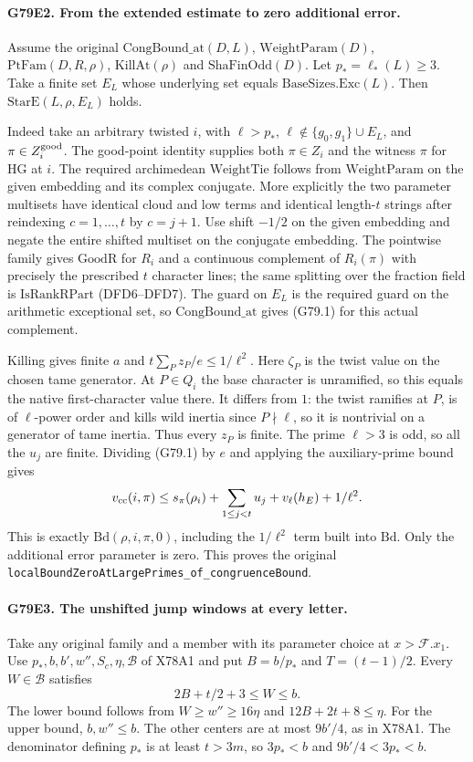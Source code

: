 \paragraph{G79E2. From the extended estimate to zero additional error.}
Assume the original $\mathrm{CongBound\_at}(D,L)$,
$\mathrm{WeightParam}(D)$, $\mathrm{PtFam}(D,R,\rho)$,
$\mathrm{KillAt}(\rho)$ and $\mathrm{ShaFinOdd}(D)$.
Let $p_*=\ell_*(L)\ge3$. Take a finite set $E_L$ whose underlying
set equals $\mathrm{BaseSizes.Exc}(L)$. Then
$\mathrm{StarE}(L,\rho,E_L)$ holds.

Indeed take an arbitrary twisted $i$, with $\ell>p_*$,
$\ell\notin\{g_0,g_1\}\cup E_L$, and $\pi\in Z_i^{\rm good}$.
The good-point identity supplies both $\pi\in Z_i$ and the witness
$\pi$ for $\mathrm{HG}$ at $i$. The required archimedean
$\mathrm{WeightTie}$ follows from $\mathrm{WeightParam}$ on the
given embedding and its complex conjugate. More explicitly the two
parameter multisets have identical cloud and low terms and identical
length-$t$ strings after reindexing $c=1,\ldots,t$ by $c=j+1$.
Use shift $-1/2$ on the given embedding and negate the entire shifted
multiset on the conjugate embedding. The pointwise family gives
$\mathrm{GoodR}$ for $R_i$ and a continuous complement of $R_i(\pi)$
with precisely the prescribed $t$ character lines; the same splitting
over the fraction field is $\mathrm{IsRankRPart}$ (DFD6--DFD7).
The guard on $E_L$ is the required guard on the arithmetic exceptional
set, so $\mathrm{CongBound\_at}$ gives (G79.1) for this actual complement.

Killing gives finite $a$ and
$t\sum_P z_P/e\le1/\ell^2$. Here $\zeta_P$ is the twist value
on the chosen tame generator. At $P\in Q_i$ the base character is
unramified, so this equals the native first-character value there.
It differs from $1$: the twist ramifies at $P$, is of $\ell$-power
order and kills wild inertia since $P\nmid\ell$, so it is nontrivial
on a generator of tame inertia. Thus every $z_P$ is finite.
The prime $\ell>3$ is odd, so all the $u_j$ are finite. Dividing
(G79.1) by $e$ and applying the auxiliary-prime bound gives
\[
 v_{\rm cc}(i,\pi)\le s_\pi(\rho_i)+
 \sum_{1\le j<t}u_j+v_\ell(h_E)+1/\ell^2.
\]
This is exactly $\mathrm{Bd}(\rho,i,\pi,0)$, including the
$1/\ell^2$ term built into $\mathrm{Bd}$. Only the additional
error parameter is zero. This proves the original
\texttt{localBoundZeroAtLargePrimes\_\allowbreak of\_\allowbreak congruenceBound}.

\paragraph{G79E3. The unshifted jump windows at every letter.}
Take any original family and a member with its parameter choice at
$x>\mathcal F.x_1$. Use $p_*,b,b',w'',S_c,\eta,\mathcal B$ of X78A1
and put $B=b/p_*$ and $T=(t-1)/2$.
Every $W\in\mathcal B$ satisfies
\[
 2B+t/2+3\le W\le b.
\]
The lower bound follows from $W\ge w''\ge16\eta$ and
$12B+2t+8\le\eta$. For the upper bound, $b,w''\le b$.
The other centers are at most $9b'/4$, as in X78A1. The denominator
defining $p_*$ is at least $t>3m$, so $3p_*<b$ and
$9b'/4<3p_*<b$.

